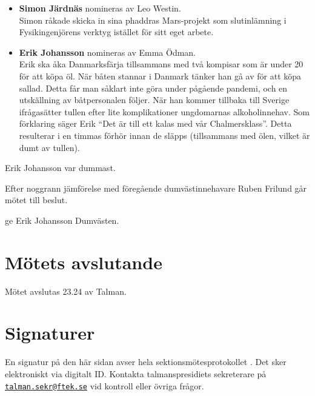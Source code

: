 \documentclass[hidelinks]{sektionsmote} %
\begin{document}
\begin{itemize}
  \item \textbf{Simon Järdnäs} nomineras av Leo Westin.\\
  Simon råkade skicka in sina phaddras Mars-projekt som slutinlämning i Fysikingenjörens verktyg istället för sitt eget arbete. 

  \item \textbf{Erik Johansson} nomineras av Emma Ödman.\\
  Erik ska åka Danmarksfärja tillsammans med två kompisar som är under 20 för att köpa öl.
  När båten stannar i Danmark tänker han gå av för att köpa sallad.
  Detta får man såklart inte göra under pågående pandemi, och en utskällning av båtpersonalen följer.
  När han kommer tillbaka till Sverige ifrågasätter tullen efter lite komplikationer ungdomarnas alkoholinnehav.
  Som förklaring säger Erik \enquote{Det är till ett kalas med vår Chalmersklass}.
  Detta resulterar i en timmas förhör innan de släpps (tillsammans med ölen, vilket är dumt av tullen).

\end{itemize}

\begin{beslut}
  \item Erik Johansson var dummast.
\end{beslut}
Efter noggrann jämförelse med föregående dumvästinnehavare Ruben Frilund går mötet till beslut.
\begin{beslut}
  \item ge Erik Johansson Dumvästen.
\end{beslut}

\section{Mötets avslutande}
Mötet avslutas 23.24 av Talman.

\clearpage
\section*{Signaturer}
\label{sec:sig}
En signatur på den här sidan avser hela sektionsmötesprotokollet \themote. Det sker elektroniskt via digitalt ID. Kontakta talmanspresidiets sekreterare på \href{mailto:talman.sekr@ftek.se}{\texttt{talman.sekr@ftek.se}} vid kontroll eller övriga frågor. 

\vspace{4cm}
\begin{center}
\end{center}
\end{document}
